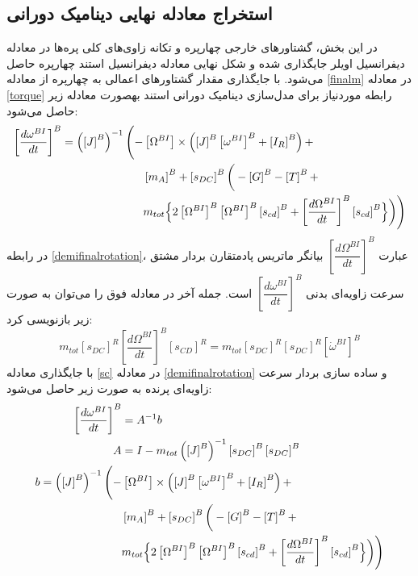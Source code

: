\subsection{ استخراج معادله نهایی دينامیک دورانی}
در این بخش، گشتاورهای خارجی چهارپره و تكانه زاوی‌های کلی پره‌ها در معادله دیفرانسیل اویلر 
جایگذاری شده و شكل نهایی معادله دیفرانسیل استند چهارپره حاصل می‌شود. با جایگذاری مقدار 
گشتاورهای اعمالی به چهارپره از معادله
\ref{finalm}
در معادله 
\ref{torque}
رابطه موردنیاز برای مدل‌سازی
دینامیک دورانی استند بهصورت معادله زیر حاصل می‌شود:
\begin{equation}\label{demifinalrotation}
	\begin{split}
		\left[\dfrac{d\omega^{BI}}{dt}\right]^B = 
		\left(\left[J\right]^B\right)^{-1}\Bigg(
		-&\left[\Omega^{BI}\right]\times\left(
		\left[J\right]^B\left[\omega^{BI}\right]^B
		+\left[I_R\right]^B\right) + \\
		&\left[m_A\right]^B+\left[s_{DC}\right]^B
		\bigg(-\left[G\right]^B
		-\left[T\right]^B+ \\
		&m_{tot}\Bigl\{2
		\left[\Omega^{BI}\right]^B
		\left[\Omega^{BI}\right]^B
		\left[s_{cd}\right]^B+
		\left[\dfrac{d\Omega^{BI}}{dt}\right]^B
		\left[s_{cd}\right]^B
		\Bigr\}\bigg)\Bigg)
	\end{split}
\end{equation}
در رابطه
\ref{demifinalrotation}،
عبارت
$\left[\dfrac{d\Omega^{BI}}{dt}\right]^B$
بیانگر ماتریس پادمتقارن بردار مشتق سرعت‌ زاویه‌ای بدنی
$\left[\dfrac{d\omega^{BI}}{dt}\right]^B$
است. جمله آخر در معادله فوق را می‌توان به صورت زیر بازنویسی کرد:
\begin{equation}\label{sc}
	m_{tot}\left[s_{DC}\right]^R
	\left[\dfrac{d\Omega^{BI}}{dt}\right]^B\left[s_{CD}\right]^R = 
	m_{tot}\left[s_{DC}\right]^R\left[s_{DC}\right]^R
	\left[\dot{\omega}^{BI}\right]^B
\end{equation}
با جایگذاری معادله
\ref{sc}
در معادله
\ref{demifinalrotation}
و ساده سازی بردار سرعت زاویه‌ای پرنده به صورت زیر حاصل می‌شود:
\begin{equation}\label{finaltorquefinal}
	\begin{split}
		\left[\dfrac{d\omega^{BI}}{dt}\right]^B &= A^{-1}b\\
		A &= I - m_{tot}\left(\left[J\right]^B\right)^{-1}
		\left[s_{DC}\right]^B
		\left[s_{DC}\right]^B\\
		b = \left(\left[J\right]^B\right)^{-1}\Bigg(
		-&\left[\Omega^{BI}\right]\times\left(
		\left[J\right]^B\left[\omega^{BI}\right]^B
		+\left[I_R\right]^B\right) + \\
		&\left[m_A\right]^B+\left[s_{DC}\right]^B
		\bigg(-\left[G\right]^B
		-\left[T\right]^B+ \\
		&m_{tot}\Bigl\{2
		\left[\Omega^{BI}\right]^B
		\left[\Omega^{BI}\right]^B
		\left[s_{cd}\right]^B+
		\left[\dfrac{d\Omega^{BI}}{dt}\right]^B
		\left[s_{cd}\right]^B
		\Bigr\}\bigg)\Bigg)		
	\end{split}
\end{equation}
